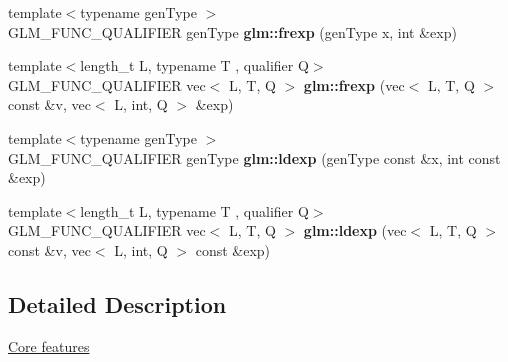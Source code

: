\begin{DoxyCompactItemize}
\item 
\mbox{\label{func__common_8inl_a90f422cea9e6e5c383bb69b593434c97}} 
{\footnotesize template$<$typename gen\+Type $>$ }\\G\+L\+M\+\_\+\+F\+U\+N\+C\+\_\+\+Q\+U\+A\+L\+I\+F\+I\+ER gen\+Type {\bfseries glm\+::frexp} (gen\+Type x, int \&exp)
\item 
\mbox{\label{func__common_8inl_a1dcaee68d7c967da4d9a5a31768934cf}} 
{\footnotesize template$<$length\+\_\+t L, typename T , qualifier Q$>$ }\\G\+L\+M\+\_\+\+F\+U\+N\+C\+\_\+\+Q\+U\+A\+L\+I\+F\+I\+ER vec$<$ L, T, Q $>$ {\bfseries glm\+::frexp} (vec$<$ L, T, Q $>$ const \&v, vec$<$ L, int, Q $>$ \&exp)
\item 
\mbox{\label{func__common_8inl_a2632eefd82cbdf3ca860c41579a5ef9e}} 
{\footnotesize template$<$typename gen\+Type $>$ }\\G\+L\+M\+\_\+\+F\+U\+N\+C\+\_\+\+Q\+U\+A\+L\+I\+F\+I\+ER gen\+Type {\bfseries glm\+::ldexp} (gen\+Type const \&x, int const \&exp)
\item 
\mbox{\label{func__common_8inl_ae65a4386c739936ac636e56cfdb9dc19}} 
{\footnotesize template$<$length\+\_\+t L, typename T , qualifier Q$>$ }\\G\+L\+M\+\_\+\+F\+U\+N\+C\+\_\+\+Q\+U\+A\+L\+I\+F\+I\+ER vec$<$ L, T, Q $>$ {\bfseries glm\+::ldexp} (vec$<$ L, T, Q $>$ const \&v, vec$<$ L, int, Q $>$ const \&exp)
\end{DoxyCompactItemize}


\subsection{Detailed Description}
\hyperlink{group__core}{Core features} 